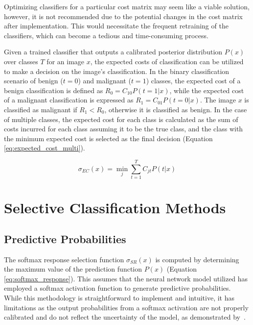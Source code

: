 Optimizing classifiers for a particular cost matrix may seem like a viable solution, however, it is not recommended due to the potential changes in the cost matrix after implementation. This would necessitate the frequent retraining of the classifiers, which can become a tedious and time-consuming process.

Given a trained classifier that outputs a calibrated posterior distribution $P(x)$ over classes $T$ for an image $x$, the expected costs of classification can be utilized to make a decision on the image's classification. In the binary classification scenario of benign ($t=0$) and malignant ($t=1$) classes, the expected cost of a benign classification is defined as $R_0 = C_{10} P(t=1|x)$, while the expected cost of a malignant classification is expressed as $R_1 = C_{01} P(t=0|x)$. The image $x$ is classified as malignant if $R_1 < R_0$, otherwise it is classified as benign. In the case of multiple classes, the expected cost for each class is calculated as the sum of costs incurred for each class assuming it to be the true class, and the class with the minimum expected cost is selected as the final decision (Equation \ref{eq:expected_cost_multi}).

\begin{equation}
	\sigma_{EC}(x) = \min_{j} \sum_{t=1}^{T} C_{jt} P(t|x)
	\label{eq:expected_cost_multi}
\end{equation}



\section{Selective Classification Methods}
\label{sec:slective_classification_methods}

\subsection{Predictive Probabilities}
\label{subsec:selective_predictive_probabilites}
The softmax response selection function $\sigma_{SR}(x)$ is computed by determining the maximum value of the prediction function $P(x)$ (Equation \ref{eq:softmax_response}). This assumes that the neural network model utilized has employed a softmax activation function to generate predictive probabilities. While this methodology is straightforward to implement and intuitive, it has limitations as the output probabilities from a softmax activation are not properly calibrated and do not reflect the uncertainty of the model, as demonstrated by~\citep{gal2016dropout}.

